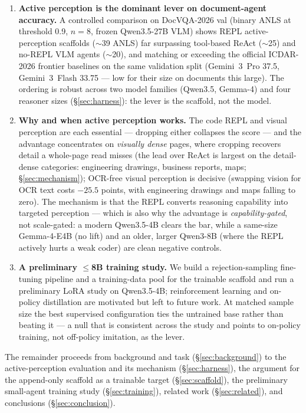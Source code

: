 \begin{enumerate}
\item \textbf{Active perception is the dominant lever on document-agent accuracy.} A controlled comparison on DocVQA-2026 val (binary ANLS at threshold 0.9, $n{=}8$, frozen Qwen3.5-27B VLM) shows REPL active-perception scaffolds ($\sim$39 ANLS) far surpassing tool-based ReAct ($\sim$25) and no-REPL VLM agents ($\sim$20), and matching or exceeding the official ICDAR-2026 frontier baselines on the same validation split (Gemini~3~Pro 37.5, Gemini~3~Flash 33.75 --- low for their size on documents this large). The ordering is robust across two model families (Qwen3.5, Gemma-4) and four reasoner sizes (\S\ref{sec:harness}): the lever is the scaffold, not the model.

\item \textbf{Why and when active perception works.} The code REPL and visual perception are each essential --- dropping either collapses the score --- and the advantage concentrates on \emph{visually dense} pages, where cropping recovers detail a whole-page read misses (the lead over ReAct is largest on the detail-dense categories: engineering drawings, business reports, maps; \S\ref{sec:mechanism}); OCR-free visual perception is decisive (swapping vision for OCR text costs $-25.5$ points, with engineering drawings and maps falling to zero). The mechanism is that the REPL converts reasoning capability into targeted perception --- which is also why the advantage is \emph{capability-gated}, not scale-gated: a modern Qwen3.5-4B clears the bar, while a same-size Gemma-4-E4B (no lift) and an older, larger Qwen3-8B (where the REPL actively hurts a weak coder) are clean negative controls.

\item \textbf{A preliminary $\leq$8B training study.} We build a rejection-sampling fine-tuning pipeline and a training-data pool for the trainable scaffold and run a preliminary LoRA study on Qwen3.5-4B; reinforcement learning and on-policy distillation are motivated but left to future work. At matched sample size the best supervised configuration ties the untrained base rather than beating it --- a null that is consistent across the study and points to on-policy training, not off-policy imitation, as the lever.
\end{enumerate}

The remainder proceeds from background and task (\S\ref{sec:background}) to the active-perception evaluation and its mechanism (\S\ref{sec:harness}), the argument for the append-only scaffold as a trainable target (\S\ref{sec:scaffold}), the preliminary small-agent training study (\S\ref{sec:training}), related work (\S\ref{sec:related}), and conclusions (\S\ref{sec:conclusion}).
